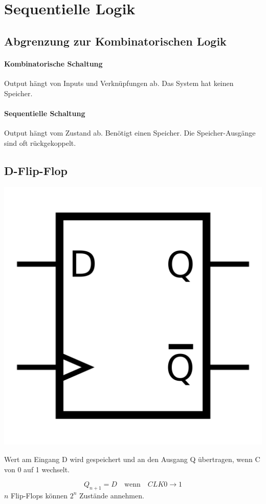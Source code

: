 \section{Sequentielle Logik}
\subsection{Abgrenzung zur Kombinatorischen Logik}
\begin{center}
    \begin{minipage}[t]{0.45\linewidth}
        \paragraph{Kombinatorische Schaltung}
        Output hängt von Inputs und Verknüpfungen ab.
	Das System hat keinen Speicher.
    \end{minipage}
    \hfill
    \begin{minipage}[t]{0.45\linewidth}
        \paragraph{Sequentielle Schaltung}
        Output hängt vom Zustand ab.
	Benötigt einen Speicher.
	Die Speicher-Ausgänge sind oft rückgekoppelt.
    \end{minipage}
\end{center}
\subsection{D-Flip-Flop}
\begin{minipage}{0.45\linewidth}
	\begin{center}
		\includegraphics[width=0.5\linewidth]{images/dflip.png}
	\end{center}
\end{minipage}
\begin{minipage}{0.45\linewidth}
	Wert am Eingang D wird gespeichert und an den Ausgang Q übertragen, wenn C von 0 auf 1 wechselt.
\end{minipage}
\begin{center}
\begin{equation*}
	Q_{n+1} = D \quad \text{wenn} \quad CLK 0 \rightarrow 1
\end{equation*}
	$n$ Flip-Flops können $2^n$ Zustände annehmen.
\end{center}

